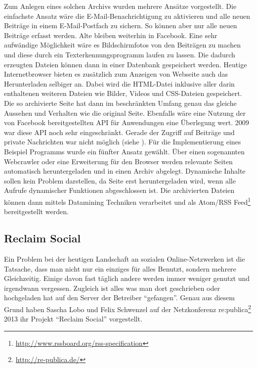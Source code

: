 Zum Anlegen eines solchen Archivs wurden mehrere Ansätze vorgestellt. Die einfachste Ansatz wäre die E-Mail-Benachrichtigung zu aktivieren und alle neuen Beiträge in einem E-Mail-Postfach zu sichern. So können aber nur alle neuen Beiträge erfasst werden. Alte bleiben weiterhin in Facebook. Eine sehr aufwändige Möglichkeit wäre es Bildschirmfotos von den Beiträgen zu machen und diese durch ein Texterkennungsprogramm laufen zu lassen. Die dadurch erzeugten Dateien können dann in einer Datenbank gespeichert werden. Heutige Internetbrowser bieten es zusätzlich zum Anzeigen von Webseite auch das Herunterladen selbiger an. Dabei wird die HTML-Datei inklusive aller darin enthaltenen weiteren Dateien wie Bilder, Videos und CSS-Dateien gespeichert. Die so archivierte Seite hat dann im beschränkten Umfang genau das gleiche Aussehen und Verhalten wie die original Seite. Ebenfalls wäre eine Nutzung der von Facebook bereitgestellten API für Anwendungen eine Überlegung wert. 2009 war diese API noch sehr eingeschränkt. Gerade der Zugriff auf Beiträge und private Nachrichten war nicht möglich (siehe \cite[S.\,253, Table 1]{McCown2009}). Für die Implementierung eines Beispiel Programms wurde ein fünfter Ansatz gewählt. Über einen sogenannten Webcrawler oder eine Erweiterung für den Browser werden relevante Seiten automatisch heruntergeladen und in einen Archiv abgelegt. Dynamische Inhalte sollen kein Problem darstellen, da Seite erst heruntergeladen wird, wenn alle Aufrufe dynamischer Funktionen abgeschlossen ist. Die archivierten Dateien können dann mittels Datamining Techniken verarbeitet und als Atom/RSS Feed\footnote{\url{http://www.rssboard.org/rss-specification}} bereitgestellt werden. 


\subsection{Reclaim Social} %
\label{sub:reclaim_social}

Ein Problem bei der heutigen Landschaft an sozialen Online-Netzwerken ist die Tatsache, dass man nicht nur ein einziges für alles Benutzt, sondern mehrere Gleichzeitig. Einige davon fast täglich andere werden immer weniger genutzt und irgendwann vergessen. Zugleich ist alles was man dort geschrieben oder hochgeladen hat auf den Server der Betreiber \enquote{gefangen}. Genau aus diesem Grund haben Sascha Lobo und Felix Schwenzel auf der Netzkonferenz re:publica\footnote{\url{http://re-publica.de/}} 2013 ihr Projekt \enquote{Reclaim Social} \cite{Schwenzel2013} vorgestellt.

